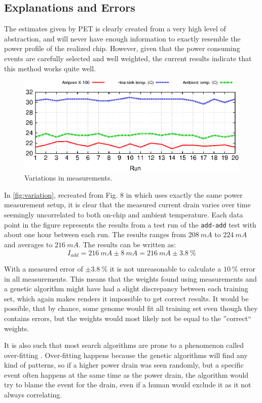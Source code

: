 \subsection{Explanations and Errors}

The estimates given by PET is clearly created from a very high level of abstraction,
and will never have enough information to exactly resemble the power profile of
the realized chip. However, given that the power consuming events are carefully
selected and well weighted, the current results indicate that this method works quite well.

\begin{figure}[ht]
    \includegraphics{figs/heat}
    \caption{Variations in measurements.}
    \label{fig:variation}
\end{figure}

In \autoref{fig:variation}, recreated from Fig. 8 in \cite{rundehvatum2013exploring} which uses exactly the
same power measurement setup, it is clear that the measured current drain varies over
time seemingly uncorrelated to both on-chip and ambient temperature. Each data point
in the figure represents the results from a test run of the \texttt{add-add} test with
about one hour between each run. The results ranges from $208~mA$ to $224~mA$ and averages to $216~mA$.
The results can be written as:
\[I_{add} = 216~mA\pm8~mA = 216~mA\pm3.8~\%\]

With a measured error of $\pm3.8~\%$ it is not unreasonable to calculate a $10~\%$ error in
all measurements. This means that the weights found using measurements and a genetic algorithm might
have had a slight discrepancy between each training set, which again makes renders it impossible to get
correct results. It would be possible, that by chance, some genome would fit all training set even though
they contains errors, but the weights would most likely not be equal to the ''correct`` weights.

It is also such that most search algorithms are prone to a phenomenon called
over-fitting \cite{russellnorvig}.  Over-fitting happens because the genetic
algorithms will find any kind of patterns, so if a higher power drain was seen
randomly, but a specific event often happens at the same time as the power
drain, the algorithm would try to blame the event for the drain, even if a human
would exclude it as it not always correlating.

